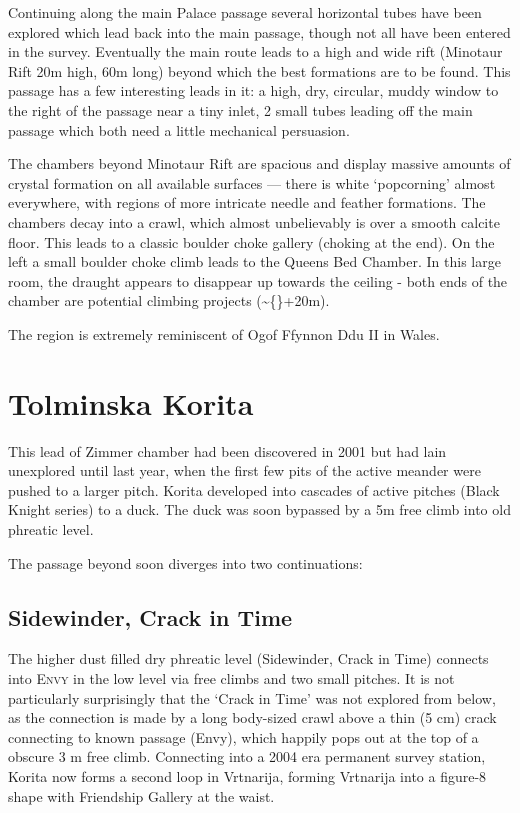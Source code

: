 Continuing along the main Palace passage several horizontal tubes have
been explored which lead back into the main passage, though not all have
been entered in the survey. Eventually the main route leads to a high
and wide rift (Minotaur Rift \textemdash{} 20m high, 60m long) beyond
which the best formations are to be found. This passage has a few
interesting leads in it: a high, dry, circular, muddy window to the
right of the passage near a tiny inlet, 2 small tubes leading off the
main passage which both need a little mechanical persuasion.

The chambers beyond Minotaur Rift are spacious and display massive
amounts of crystal formation on all available surfaces --- there is
white `popcorning' almost everywhere, with regions of more intricate
needle and feather formations. The chambers decay into a crawl, which
almost unbelievably is over a smooth calcite floor. This leads to a
classic boulder choke gallery (choking at the end). On the left a small
boulder choke climb leads to the Queens Bed Chamber. In this large room,
the draught appears to disappear up towards the ceiling - both ends of
the chamber are potential climbing projects (\textasciitilde\{\}+20m).

The region is extremely reminiscent of Ogof Ffynnon Ddu II in Wales.

\section{Tolminska Korita}\label{tolminska-korita}

This lead of Zimmer chamber had been discovered in 2001 but had lain
unexplored until last year, when the first few pits of the active
meander were pushed to a larger pitch. Korita developed into cascades of
active pitches (Black Knight series) to a duck. The duck was soon
bypassed by a 5m free climb into old phreatic level.

The passage beyond soon diverges into two continuations:

\subsection{Sidewinder, Crack in Time}\label{sidewinder-crack-in-time}

The higher dust filled dry phreatic level (Sidewinder, Crack in Time)
connects into \textsc{Envy} in the low level via free climbs and two
small pitches. It is not particularly surprisingly that the `Crack in
Time' was not explored from below, as the connection is made by a long
body-sized crawl above a thin (5 cm) crack connecting to known passage
(Envy), which happily pops out at the top of a obscure 3 m free climb.
Connecting into a 2004 era permanent survey station, Korita now forms a
second loop in Vrtnarija, forming Vrtnarija into a figure-8 shape with
Friendship Gallery at the waist.

